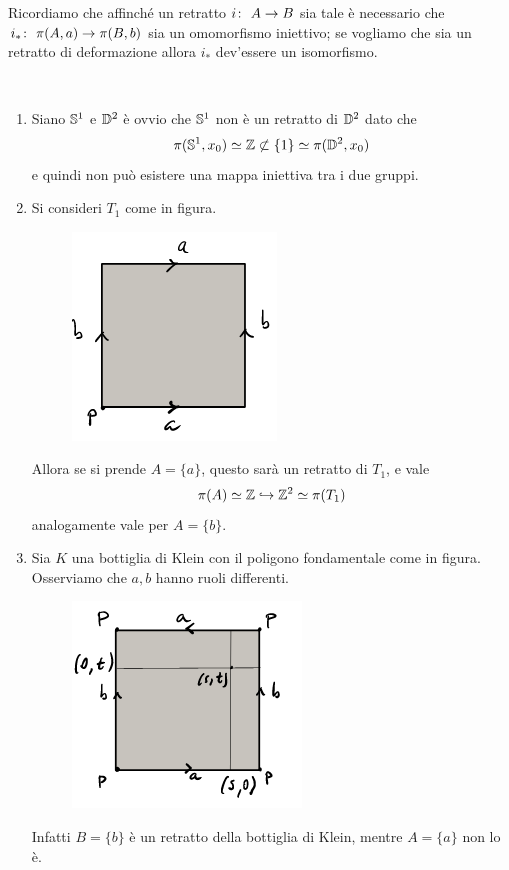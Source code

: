 \begin{remark}
	Ricordiamo che affinché un retratto $\morphism{i}{A}{B}$ sia tale è necessario che $\morphism{i_*}{\pi(A, a)}{\pi(B, b)}$ sia un omomorfismo iniettivo; se vogliamo che sia un retratto di deformazione allora $i_*$ dev'essere un isomorfismo. 
\end{remark}

\begin{example}\
	\begin{enumerate}
		\item Siano $\S^1$ e $\D^2$ è ovvio che $\S^1$ non è un retratto di $\D^2$ dato che
		\begin{equation*}
		\pi(\S^1, x_0) \simeq \Z \not\subset \{1\} \simeq \pi(\D^2, x_0)
		\end{equation*}
		e quindi non può esistere una mappa iniettiva tra i due gruppi. 
		\item Si consideri $T_1$ come in figura.
		\begin{figure}[H]
			\centering
			\includegraphics[width=0.3\linewidth]{images/topologia_algebrica/torus_polygon}
			\caption{}
			\label{fig:toruspolygon}
		\end{figure}
		Allora se si prende $A = \{a\}$, questo sarà un retratto di $T_1$, e vale
		\begin{equation*}
			\pi(A) \simeq \Z \hookrightarrow \Z^2 \simeq \pi(T_1)
		\end{equation*}
		analogamente vale per $A = \{b\}$.
		\item Sia $K$ una bottiglia di Klein con il poligono fondamentale come in figura. Osserviamo che $a, b$ hanno ruoli differenti. 
		\begin{figure}[H]
			\centering
			\includegraphics[width=0.3\linewidth]{images/topologia_algebrica/klein_polygon}
			\caption{}
			\label{fig:kelinpolygon}
		\end{figure}
		Infatti $B = \{b\}$ è un retratto della bottiglia di Klein, mentre $A = \{a\}$ non lo è. \
		

\end{enumerate}
\end{example}
